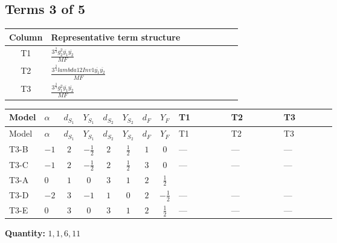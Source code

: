 \documentclass[8pt]{article}
\begin{document}
\begin{landscape}
\subsection*{Terms 3 of 5}
\begin{center}
\begin{tabular}{@{}c >{\raggedright\arraybackslash}p{0.82\linewidth}@{}}
\toprule
Column & Representative term structure \\
\midrule
T1 & \(\displaystyle \frac{3^{\frac{3}{4}} g_{2}^{2} \overline{y_{1}} \overline{y_{2}}}{MF}\) \\
\midrule
T2 & \(\displaystyle \frac{3^{\frac{3}{4}} lambda12Inv1 \overline{y_{1}} \overline{y_{2}}}{MF}\) \\
\midrule
T3 & \(\displaystyle \frac{3^{\frac{3}{4}} g_{1}^{2} \overline{y_{1}} \overline{y_{2}}}{MF}\) \\
\midrule
\bottomrule
\end{tabular}
\end{center}
\smallskip
\tiny
\begin{longtable}{@{}llcccccc >{\raggedright\arraybackslash}p{0.21\linewidth} >{\raggedright\arraybackslash}p{0.21\linewidth} >{\raggedright\arraybackslash}p{0.21\linewidth}@{}}
\toprule
Model & $\alpha$ & $d_{S_1}$ & $Y_{S_1}$ & $d_{S_2}$ & $Y_{S_2}$ & $d_F$ & $Y_F$ & T1 & T2 & T3 \\
\midrule
\endfirsthead
\toprule
Model & $\alpha$ & $d_{S_1}$ & $Y_{S_1}$ & $d_{S_2}$ & $Y_{S_2}$ & $d_F$ & $Y_F$ & T1 & T2 & T3 \\
\midrule
\endhead
T3-B & $-1$ & $2$ & $-\frac{1}{2}$ & $2$ & $\frac{1}{2}$ & $1$ & $0$ & --- & --- & --- \\
\midrule
T3-C & $-1$ & $2$ & $-\frac{1}{2}$ & $2$ & $\frac{1}{2}$ & $3$ & $0$ & --- & --- & --- \\
\midrule
T3-A & $0$ & $1$ & $0$ & $3$ & $1$ & $2$ & $\frac{1}{2}$ & \scriptsize\adjustbox{max width=\linewidth}{$\begin{gathered} - \frac{17 \cdot 3^{\frac{3}{4}} g_{2}^{2} \overline{y_{1}} \overline{y_{2}}}{24 MF}\end{gathered}$} & \scriptsize\adjustbox{max width=\linewidth}{$\begin{gathered} - \frac{3^{\frac{3}{4}} lambda12Inv1 \overline{y_{1}} \overline{y_{2}}}{6 MF}\end{gathered}$} & \scriptsize\adjustbox{max width=\linewidth}{$\begin{gathered} - \frac{3^{\frac{3}{4}} g_{1}^{2} \overline{y_{1}} \overline{y_{2}}}{8 MF}\end{gathered}$} \\
\midrule
T3-D & $-2$ & $3$ & $-1$ & $1$ & $0$ & $2$ & $-\frac{1}{2}$ & --- & --- & --- \\
\midrule
T3-E & $0$ & $3$ & $0$ & $3$ & $1$ & $2$ & $\frac{1}{2}$ & --- & --- & --- \\
\midrule
\bottomrule
\end{longtable}
\clearpage
\noindent\textbf{Quantity: }$\mathrm{1,1,6,11}$\par\smallskip

\end{landscape}
\end{document}
